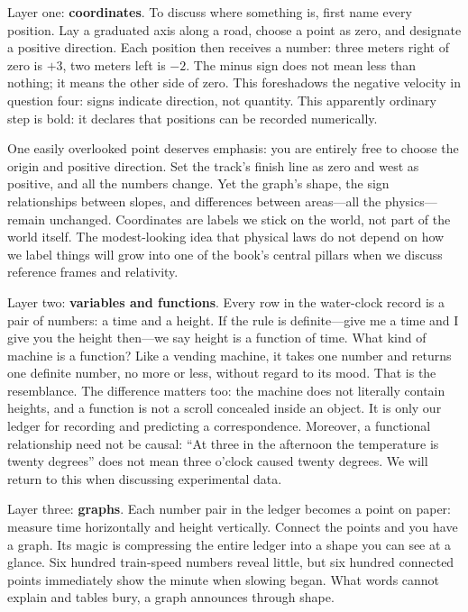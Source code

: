 Layer one: \textbf{coordinates}. To discuss where something is, first name every position. Lay a graduated axis along a road, choose a point as zero, and designate a positive direction. Each position then receives a number: three meters right of zero is \(+3\), two meters left is \(-2\). The minus sign does not mean less than nothing; it means the other side of zero. This foreshadows the negative velocity in question four: signs indicate direction, not quantity. This apparently ordinary step is bold: it declares that positions can be recorded numerically.

One easily overlooked point deserves emphasis: you are entirely free to choose the origin and positive direction. Set the track's finish line as zero and west as positive, and all the numbers change. Yet the graph's shape, the sign relationships between slopes, and differences between areas---all the physics---remain unchanged. Coordinates are labels we stick on the world, not part of the world itself. The modest-looking idea that physical laws do not depend on how we label things will grow into one of the book's central pillars when we discuss reference frames and relativity.

Layer two: \textbf{variables and functions}. Every row in the water-clock record is a pair of numbers: a time and a height. If the rule is definite---give me a time and I give you the height then---we say height is a function of time. What kind of machine is a function? Like a vending machine, it takes one number and returns one definite number, no more or less, without regard to its mood. That is the resemblance. The difference matters too: the machine does not literally contain heights, and a function is not a scroll concealed inside an object. It is only our ledger for recording and predicting a correspondence. Moreover, a functional relationship need not be causal: ``At three in the afternoon the temperature is twenty degrees'' does not mean three o'clock caused twenty degrees. We will return to this when discussing experimental data.

Layer three: \textbf{graphs}. Each number pair in the ledger becomes a point on paper: measure time horizontally and height vertically. Connect the points and you have a graph. Its magic is compressing the entire ledger into a shape you can see at a glance. Six hundred train-speed numbers reveal little, but six hundred connected points immediately show the minute when slowing began. What words cannot explain and tables bury, a graph announces through shape.


